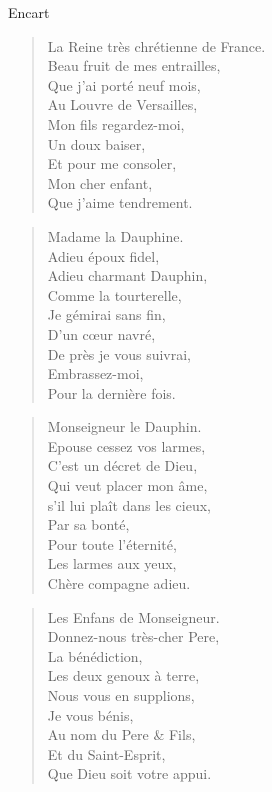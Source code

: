 \begin{diary}{Encart}{}
        \begin{verse}La Reine très chrétienne de
                                 France.\\Beau fruit de mes entrailles,\\Que j'ai porté neuf mois,\\Au Louvre de
                                    Versailles,\\Mon fils
                                 regardez-moi,\\Un doux baiser,\\Et pour me consoler,\\Mon cher enfant,\\Que j'aime tendrement.\\\end{verse}
        \bigskip
        
        \begin{verse}Madame la Dauphine.\\Adieu époux fidel,\\Adieu charmant Dauphin,\\Comme la tourterelle,\\Je gémirai sans fin,\\D'un cœur navré,\\De près je vous suivrai,\\Embrassez-moi,\\Pour la dernière fois.\\\end{verse}
        \bigskip
        
        \begin{verse}Monseigneur le Dauphin.\\Epouse cessez vos larmes,\\C’est un décret de Dieu,\\Qui veut placer mon âme,\\s'il lui plaît dans les cieux,\\Par sa bonté,\\Pour toute l'éternité,\\Les larmes aux yeux,\\Chère compagne adieu.\\\end{verse}
        \bigskip
        
        \begin{verse}Les Enfans de Monseigneur.\\Donnez-nous très-cher
                                    Pere,\\La bénédiction,\\Les deux genoux à terre,\\Nous vous en supplions,\\Je vous bénis,\\Au nom du Pere & Fils,\\Et du Saint-Esprit,\\Que Dieu soit votre appui.\\\end{verse}
        \bigskip
        

\end{diary}
